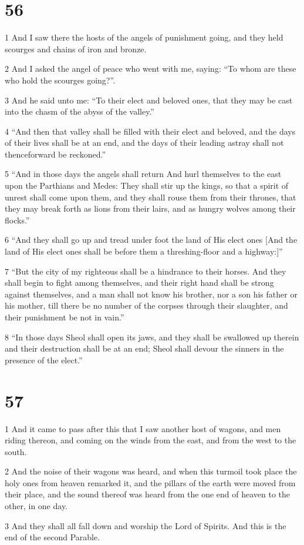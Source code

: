 \chapter{56}

\par 1 And I saw there the hosts of the angels of punishment going, and they held scourges and chains of iron and bronze.
\par 2 And I asked the angel of peace who went with me, saying: “To whom are these who hold the scourges going?”.
\par 3 And he said unto me: “To their elect and beloved ones, that they may be cast into the chasm of the abyss of the valley.”
\par 4 “And then that valley shall be filled with their elect and beloved, and the days of their lives shall be at an end, and the days of their leading astray shall not thenceforward be reckoned.”
\par 5 “And in those days the angels shall return And hurl themselves to the east upon the Parthians and Medes: They shall stir up the kings, so that a spirit of unrest shall come upon them, and they shall rouse them from their thrones, that they may break forth as lions from their lairs, and as hungry wolves among their flocks.”
\par 6 “And they shall go up and tread under foot the land of His elect ones [And the land of His elect ones shall be before them a threshing-floor and a highway:]”
\par 7 “But the city of my righteous shall be a hindrance to their horses. And they shall begin to fight among themselves, and their right hand shall be strong against themselves, and a man shall not know his brother, nor a son his father or his mother, till there be no number of the corpses through their slaughter, and their punishment be not in vain.”
\par 8 “In those days Sheol shall open its jaws, and they shall be swallowed up therein and their destruction shall be at an end; Sheol shall devour the sinners in the presence of the elect.”

\chapter{57}

\par 1 And it came to pass after this that I saw another host of wagons, and men riding thereon, and coming on the winds from the east, and from the west to the south.
\par 2 And the noise of their wagons was heard, and when this turmoil took place the holy ones from heaven remarked it, and the pillars of the earth were moved from their place, and the sound thereof was heard from the one end of heaven to the other, in one day.
\par 3 And they shall all fall down and worship the Lord of Spirits. And this is the end of the second Parable.

